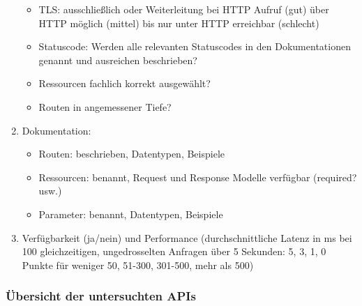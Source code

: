 \documentclass[notitlepage, hidelinks]{article}
\begin{document}
\begin{enumerate}
\begin{itemize}
\item TLS: ausschließlich oder Weiterleitung bei HTTP Aufruf (gut) über HTTP möglich (mittel) bis nur unter HTTP erreichbar (schlecht)
\item Statuscode: Werden alle relevanten Statuscodes in den Dokumentationen genannt und ausreichen beschrieben?
\item Ressourcen fachlich korrekt ausgewählt?
\item Routen in angemessener Tiefe?
\end{itemize}
\item Dokumentation:
\begin{itemize}
\item Routen: beschrieben, Datentypen, Beispiele
\item Ressourcen: benannt, Request und Response Modelle verfügbar (required? usw.)
\item Parameter: benannt, Datentypen, Beispiele
\end{itemize}
\item Verfügbarkeit (ja/nein) und Performance (durchschnittliche Latenz in ms bei 100 gleichzeitigen, ungedrosselten Anfragen über 5 Sekunden: 5, 3, 1, 0 Punkte für weniger 50, 51-300, 301-500,  mehr als 500)
\end{enumerate}

\newpage

\subsubsection{Übersicht der untersuchten APIs}
\end{document}
